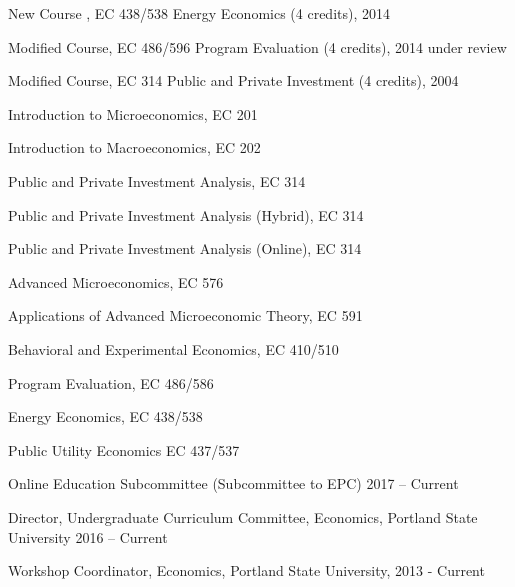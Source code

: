 \documentclass[Computer Science]{vita}
\begin{document}
\begin{vita}
\begin{Instructional Activities}
    \begin{Curriculum Development}
    \item New Course , EC 438/538 Energy Economics (4 credits), 2014 
    \item Modified Course, EC 486/596 Program Evaluation (4 credits), 2014 under review
    \item Modified Course, EC 314 Public and Private Investment (4
      credits), 2004
    \end{Curriculum Development}

    \begin{Courses}
    \item Introduction to Microeconomics, EC 201
    \item Introduction to Macroeconomics, EC 202
    \item Public and Private Investment Analysis, EC 314
    \item Public and Private Investment Analysis (Hybrid), EC 314
    \item Public and Private Investment Analysis (Online), EC 314
				
    \item Advanced Microeconomics, EC 576
    \item Applications of Advanced Microeconomic Theory, EC 591

    \item Behavioral and Experimental Economics, EC 410/510
    \item Program Evaluation, EC 486/586
   \item Energy Economics, EC 438/538
   \item Public Utility Economics EC 437/537
    \end{Courses}

      
  \end{Instructional Activities}
  \begin{Professional and Service Activities}

    \begin{University}
    
    \item Online Education Subcommittee (Subcommittee to EPC) 2017 -- Current
    
    \item Director, Undergraduate Curriculum Committee, Economics, Portland State University 2016 -- Current
    
    \item Workshop Coordinator, Economics, Portland State University, 2013 - Current
    

\end{University}
\end{Professional and Service Activities}
\end{vita}
\end{document}
